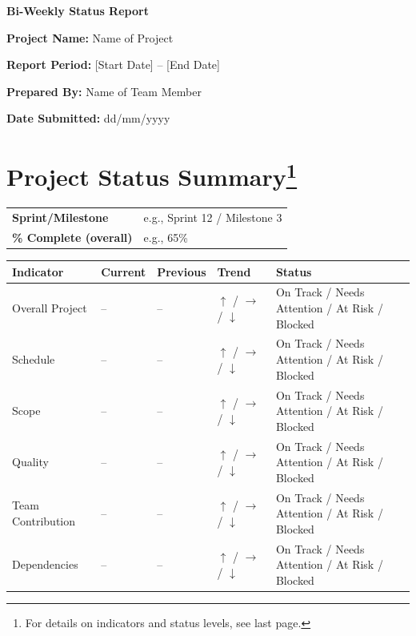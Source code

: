 \documentclass[11pt,a4paper]{article}
\newcommand{\field}[2]{\textbf{#1:} #2\par}
\begin{document}
\begin{center}
    {\LARGE\bfseries Bi-Weekly Status Report}\\[10pt]
\end{center}

\field{Project Name}{Name of Project}
\field{Report Period}{[Start Date] -- [End Date]}
\field{Prepared By}{Name of Team Member}
\field{Date Submitted}{dd/mm/yyyy}

\vspace{8pt}

\section{Project Status Summary\footnote{For details on indicators and status levels, see last page.}}

\renewcommand{\arraystretch}{1.3}
\begin{tabular}{>{\bfseries}p{} p{}}
Sprint/Milestone & e.g., Sprint 12 / Milestone 3 \\
\% Complete (overall) & e.g., 65\% \\
\end{tabular}

\begin{table}[htbp]
\centering
\label{tab:project-health-dashboard}
\renewcommand{\arraystretch}{1.4}

\begin{tabular}{>{\raggedright\arraybackslash}p{3.3cm}
                >{\centering\arraybackslash}p{2.4cm}
                >{\centering\arraybackslash}p{2.4cm}
                >{\centering\arraybackslash}p{1.7cm}
                >{\centering\arraybackslash}p{3.2cm}}
\toprule
\textbf{Indicator} &
\textbf{Current} &
\textbf{Previous} &
\textbf{Trend} &
\textbf{Status} \\
\midrule

Overall Project &
-- &
-- &
$\uparrow$ / $\rightarrow$ / $\downarrow$ &
On Track / Needs Attention / At Risk / Blocked\\

Schedule &
-- &
-- &
$\uparrow$ / $\rightarrow$ / $\downarrow$ &
On Track / Needs Attention / At Risk / Blocked\\

Scope &
-- &
-- &
$\uparrow$ / $\rightarrow$ / $\downarrow$ &
On Track / Needs Attention / At Risk / Blocked\\

Quality &
-- &
-- &
$\uparrow$ / $\rightarrow$ / $\downarrow$ &
On Track / Needs Attention / At Risk / Blocked\\

Team Contribution &
-- &
-- &
$\uparrow$ / $\rightarrow$ / $\downarrow$ &
On Track / Needs Attention / At Risk / Blocked\\

Dependencies &
-- &
-- &
$\uparrow$ / $\rightarrow$ / $\downarrow$ &
On Track / Needs Attention / At Risk / Blocked\\

\bottomrule
\end{tabular}
\end{table}
\end{document}
